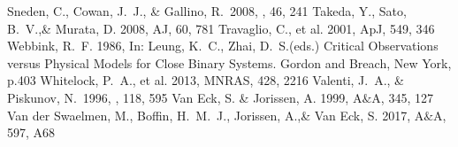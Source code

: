 \documentclass[a4paper,fleqn,usenatbib]{mnras}
\begin{document}
\begin{thebibliography}{99}
 Sneden, C., Cowan, J.~J., \& Gallino, R.\ 2008, \araa, 46, 241 
Takeda, Y., Sato, B.~V.,\& Murata, D. 2008, 
AJ, 60, 781
Travaglio, C., et al. 2001, 
ApJ, 549, 346
Webbink, R.~F. 1986, 
In: Leung, K.~C., Zhai, D.~S.(eds.) Critical Observations versus Physical Models for Close Binary Systems. Gordon and Breach, New York, p.403
Whitelock, P.~A., et al. 2013, 
MNRAS, 428, 2216
 Valenti, J.~A., \& Piskunov, N.\ 1996, \aaps, 118, 595 
Van Eck, S. \& Jorissen, A. 1999, 
A$\&$A, 345, 127
Van der Swaelmen, M., Boffin, H.~M.~J., Jorissen, A.,\& Van Eck, S. 2017, 
A$\&$A, 597, A68
\end{thebibliography}
\bsp	%
\label{lastpage}
\end{document}

